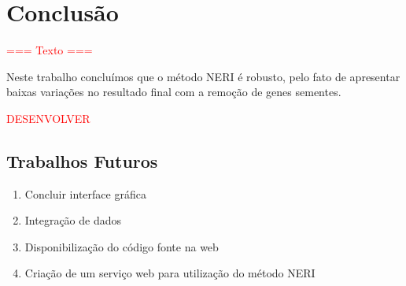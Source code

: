 \chapter{Conclusão}
\textcolor{red}{=== Texto ===}

Neste trabalho concluímos que o método NERI é robusto, pelo fato de apresentar baixas variações no resultado final com a remoção de genes sementes.

\textcolor{red}{DESENVOLVER}


\section{Trabalhos Futuros}


\begin{enumerate}
\item Concluir interface gráfica
    
    
    
    

\item Integração de dados
    
\item Disponibilização do código fonte na web

\item Criação de um serviço web para utilização do método NERI

\end{enumerate}
